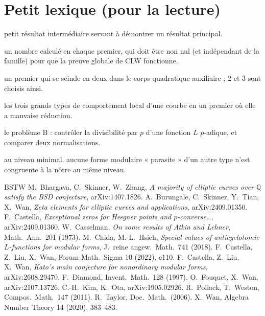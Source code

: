 \documentclass[11pt]{amsart}
\newcommand{\Q}{\mathbb{Q}}
\begin{document}
\section*{Petit lexique (pour la lecture)}
\begin{description}[font=\normalfont\itshape, leftmargin=0pt]
\item[Lemme] petit résultat intermédiaire servant à démontrer un résultat principal.
\item[Intégrale locale de produit triple] un nombre calculé en chaque premier, qui doit être non nul (et indépendant de la famille) pour que la preuve globale de CLW fonctionne.
\item[Place décomposée] un premier qui se scinde en deux dans le corps quadratique auxiliaire ; $2$ et $3$ sont choisis ainsi.
\item[Supercuspidale, série principale, Steinberg] les trois grands types de comportement local d'une courbe en un premier où elle a mauvaise réduction.
\item[Invariant $\mu$, périodes] le problème B : contrôler la divisibilité par $p$ d'une fonction $L$ $p$-adique, et comparer deux normalisations.
\item[Minimal] au niveau minimal, aucune forme modulaire « parasite » d'un autre type n'est congruente à la nôtre au même niveau.
\end{description}

\begin{thebibliography}{BSTW}\small
{} M.~Bhargava, C.~Skinner, W.~Zhang, \emph{A majority of elliptic curves over $\Q$ satisfy the BSD conjecture}, arXiv:1407.1826.
 A.~Burungale, C.~Skinner, Y.~Tian, X.~Wan, \emph{Zeta elements for elliptic curves and applications}, arXiv:2409.01350.
 F.~Castella, \emph{Exceptional zeros for Heegner points and $p$-converse\dots}, arXiv:2409.01360.
 W.~Casselman, \emph{On some results of Atkin and Lehner}, Math.\ Ann.\ 201 (1973).
 M.~Chida, M.-L.~Hsieh, \emph{Special values of anticyclotomic $L$-functions for modular forms}, J.\ reine angew.\ Math.\ 741 (2018).
 F.~Castella, Z.~Liu, X.~Wan, Forum Math.\ Sigma 10 (2022), e110.
 F.~Castella, Z.~Liu, X.~Wan, \emph{Kato's main conjecture for nonordinary modular forms}, arXiv:2608.29470.
 F.~Diamond, Invent.\ Math.\ 128 (1997).
 O.~Fouquet, X.~Wan, arXiv:2107.13726.
 C.-H.~Kim, K.~Ota, arXiv:1905.02926.
 R.~Pollack, T.~Weston, Compos.\ Math.\ 147 (2011).
 R.~Taylor, Doc.\ Math.\ (2006).
 X.~Wan, Algebra Number Theory 14 (2020), 383--483.
\end{thebibliography}
\end{document}
